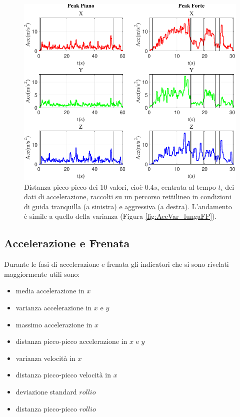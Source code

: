 \documentclass[class=article]{standalone}
\begin{document}
	\begin{center}
		\begin{figure}[h!]
			\centering\includegraphics[width=.7\textwidth]{img/lungaFP/Acc/Peak}
			\caption[]{Distanza picco-picco dei 10 valori, cioè \(0.4s\), centrata al tempo \(t_{i}\) dei dati di accelerazione, raccolti su un percorso rettilineo in condizioni di guida tranquilla (a sinistra) e aggressiva (a destra). L'andamento è simile a quello della varianza (Figura \ref{fig:AccVar_lungaFP}).}
			\label{fig:AccPeak_lungaFP}
		\end{figure}
	\end{center}
	
	
	\newpage
	\subsection{Accelerazione e Frenata}
	Durante le fasi di accelerazione e frenata gli indicatori che si sono rivelati maggiormente utili sono:
	\begin{itemize}
		\item media accelerazione in \(x\)
		\item varianza accelerazione in \(x\) e \(y\)
		\item massimo accelerazione in \(x\)
		\item distanza picco-picco accelerazione in \(x\) e \(y\)
		\item varianza velocità in \(x\)
		\item distanza picco-picco velocità in \(x\)
		\item deviazione standard \(rollio\)
		\item distanza picco-picco \(rollio\)
	\end{itemize}
	
\end{document}
